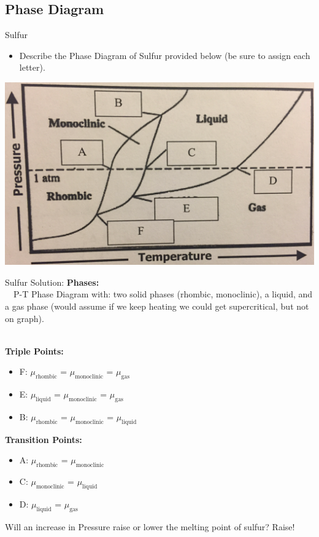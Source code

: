 \documentclass[t,10pt,mathserif,xcolor=pst,pdftex]{beamer}
\begin{document}
\subsection{Phase Diagram}

\begin{frame}{Sulfur}

\begin{itemize}
\item Describe the Phase Diagram of Sulfur provided below (be sure to assign each letter). 
\end{itemize}

\includegraphics[height=0.70\textheight,width=.9\textwidth]{pd.png}

\end{frame}

\begin{frame}{Sulfur Solution:}
\textbf{Phases:}\\~\
P-T Phase Diagram with: two solid phases (rhombic, monoclinic), a liquid, and a gas phase (would assume if we keep heating we could get supercritical, but not on graph). \\~\

\textbf{Triple Points:}
\begin{itemize}
\item F: \quad $\mu_{\text{rhombic}}$ = $\mu_{\text{monoclinic}}$ = $\mu_{\text{gas}}$
\item E: \quad $\mu_{\text{liquid}}$ = $\mu_{\text{monoclinic}}$ = $\mu_{\text{gas}}$
\item B: \quad $\mu_{\text{rhombic}}$ = $\mu_{\text{monoclinic}}$ = $\mu_{\text{liquid}}$
\end{itemize}

\textbf{Transition Points:}
\begin{itemize}
\item A: \quad $\mu_{\text{rhombic}}$ = $\mu_{\text{monoclinic}}$ 
\item C: \quad $\mu_{\text{monoclinic}}$ = $\mu_{\text{liquid}}$
\item D: \quad $\mu_{\text{liquid}}$ = $\mu_{\text{gas}}$
\end{itemize}

Will an increase in Pressure raise or lower the melting point of sulfur? \qquad Raise!

\end{frame}
\end{document}
